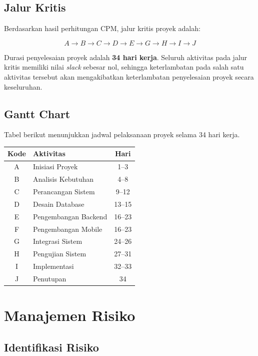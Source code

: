 \documentclass[12pt,a4paper]{article}
\begin{document}
\subsection{Jalur Kritis}

Berdasarkan hasil perhitungan CPM, jalur kritis proyek adalah:

\[
A \rightarrow B \rightarrow C \rightarrow D \rightarrow E \rightarrow G \rightarrow H \rightarrow I \rightarrow J
\]

Durasi penyelesaian proyek adalah \textbf{34 hari kerja}. Seluruh aktivitas pada jalur kritis memiliki nilai \textit{slack} sebesar nol, sehingga keterlambatan pada salah satu aktivitas tersebut akan mengakibatkan keterlambatan penyelesaian proyek secara keseluruhan.

\subsection{Gantt Chart}

Tabel berikut menunjukkan jadwal pelaksanaan proyek selama 34 hari kerja.

\begin{table}[H]
\centering
\begin{tabular}{clc}
\toprule
Kode & Aktivitas & Hari \\
\midrule
A & Inisiasi Proyek & 1--3 \\
B & Analisis Kebutuhan & 4--8 \\
C & Perancangan Sistem & 9--12 \\
D & Desain Database & 13--15 \\
E & Pengembangan Backend & 16--23 \\
F & Pengembangan Mobile & 16--23 \\
G & Integrasi Sistem & 24--26 \\
H & Pengujian Sistem & 27--31 \\
I & Implementasi & 32--33 \\
J & Penutupan & 34 \\
\bottomrule
\end{tabular}
\end{table}


\section{Manajemen Risiko}

\subsection{Identifikasi Risiko}
\end{document}
